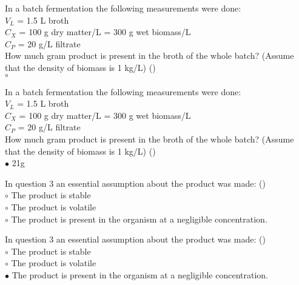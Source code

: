 \documentclass[]{beamer}
\begin{document}
\begin{frame}[shrink] {}
\addtocounter{questions}{1}
\color{blue}
In a batch fermentation the following measurements were done: \\
\color{gray}
$V_L$ = 1.5 L broth  \\
$C_X$ = 100 g dry matter/L = 300 g wet biomass/L \\
$C_P$ = 20 g/L filtrate \\
\color{blue}
How much gram product is present in the broth of the whole batch?
(Assume that the density of biomass is 1 kg/L) ()\\
\color{black}
{\color{red}$\circ$}  \\
\end{frame}
\begin{frame}[shrink] {}
\addtocounter{answers}{1}
\color{blue}
In a batch fermentation the following measurements were done: \\
\color{gray}
$V_L$ = 1.5 L broth  \\
$C_X$ = 100 g dry matter/L = 300 g wet biomass/L \\
$C_P$ = 20 g/L filtrate \\
\color{blue}
How much gram product is present in the broth of the whole batch?
(Assume that the density of biomass is 1 kg/L) ()\\
\color{black}
{\color{red}$\bullet$} 21g \\
\end{frame}

\begin{frame}[shrink] {}
\addtocounter{questions}{1}
\color{blue}
In question 3 an essential assumption about the product was made: ()\\
\color{black}
\setlength{\parindent}{-0.4cm}
{\color{red}$\circ$}  The product is stable \\
{\color{red}$\circ$} The product is volatile \\
{\color{red}$\circ$} The product is present in the organism at a negligible concentration.  \\
\end{frame}
\begin{frame}[shrink] {}
\addtocounter{answers}{1}
\color{blue}
In question 3 an essential assumption about the product was made: ()\\
\color{black}
\setlength{\parindent}{-0.4cm}
{\color{red}$\circ$}  The product is stable \\
{\color{red}$\circ$} The product is volatile \\
{\color{red}$\bullet$} The product is present in the organism at a negligible concentration.  \\
\end{frame}
\end{document}

